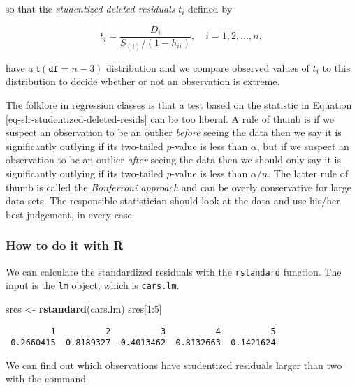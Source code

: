 \documentclass[]{book}
\newenvironment{Shaded}{\begin{snugshade}}{\end{snugshade}}
\newcommand{\KeywordTok}[1]{\textcolor[rgb]{0.13,0.29,0.53}{\textbf{{#1}}}}
\newcommand{\DecValTok}[1]{\textcolor[rgb]{0.00,0.00,0.81}{{#1}}}
\newcommand{\StringTok}[1]{\textcolor[rgb]{0.31,0.60,0.02}{{#1}}}
\newcommand{\NormalTok}[1]{{#1}}
\numberwithin{equation}{chapter}
\numberwithin{figure}{chapter}
\theoremstyle{plain}
\theoremstyle{definition}
\theoremstyle{remark}
\theoremstyle{definition}
\theoremstyle{definition}
\theoremstyle{remark}
\begin{document}
so that the \emph{studentized deleted residuals} \(t_{i}\) defined by

\begin{equation}
\label{eq-slr-studentized-deleted-resids}
t_{i}=\frac{D_{i}}{S_{(i)}/(1-h_{ii})},\quad i=1,2,\ldots,n,
\end{equation}

have a \(\mathsf{t}(\mathtt{df}=n-3)\) distribution and we compare
observed values of \(t_{i}\) to this distribution to decide whether or
not an observation is extreme.

The folklore in regression classes is that a test based on the statistic
in Equation \eqref{eq-slr-studentized-deleted-resids} can be too
liberal. A rule of thumb is if we suspect an observation to be an
outlier \emph{before} seeing the data then we say it is significantly
outlying if its two-tailed \(p\)-value is less than \(\alpha\), but if
we suspect an observation to be an outlier \emph{after} seeing the data
then we should only say it is significantly outlying if its two-tailed
\(p\)-value is less than \(\alpha/n\). The latter rule of thumb is
called the \emph{Bonferroni approach} and can be overly conservative for
large data sets. The responsible statistician should look at the data
and use his/her best judgement, in every case.

\subsubsection{How to do it with R}\label{how-to-do-it-with-r-55}

We can calculate the standardized residuals with the \texttt{rstandard}
function. The input is the \texttt{lm} object, which is
\texttt{cars.lm}.

\begin{Shaded}
\begin{Highlighting}[]
\NormalTok{sres <-}\StringTok{ }\KeywordTok{rstandard}\NormalTok{(cars.lm)}
\NormalTok{sres[}\DecValTok{1}\NormalTok{:}\DecValTok{5}\NormalTok{]}
\end{Highlighting}
\end{Shaded}

\begin{verbatim}
         1          2          3          4          5 
 0.2660415  0.8189327 -0.4013462  0.8132663  0.1421624 
\end{verbatim}

We can find out which observations have studentized residuals larger
than two with the command
\end{document}
